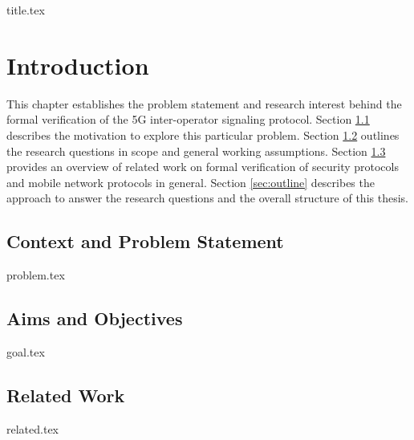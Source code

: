 \documentclass[a4paper,12pt,twoside]{report}
\begin{document}
{title.tex}
\pagestyle{empty}
\blankpage


\blankpage

{}
\pagestyle{plain}
\setcounter{page}{5}
\setcounter{tocdepth}{2}
\tableofcontents

\clearpage

\listoffigures
\begingroup
\let\clearpage\relax
\vspace{3cm}
\listoftables
\endgroup

\printglossary

\printglossary[type=\acronymtype,title=Abbreviations]

\cleardoublepage
\afterpage{\null\newpage}
\cleardoublepage

\chapter{Introduction}
\label{chap:intro}

This chapter establishes the problem statement and research interest behind the formal verification of the 5G inter-operator signaling protocol.
Section \ref{sec:problem} describes the motivation to explore this particular problem.
Section \ref{sec:goal} outlines the research questions in scope and general working assumptions.
Section \ref{sec:related} provides an overview of related work on formal verification of security protocols and mobile network protocols in general.
Section \ref{sec:outline} describes the approach to answer the research questions and the overall structure of this thesis.

\section{Context and Problem Statement}
\label{sec:problem}
{problem.tex}

\section{Aims and Objectives}
\label{sec:goal}
{goal.tex}

\section{Related Work}
\label{sec:related}
{related.tex}
\end{document}
